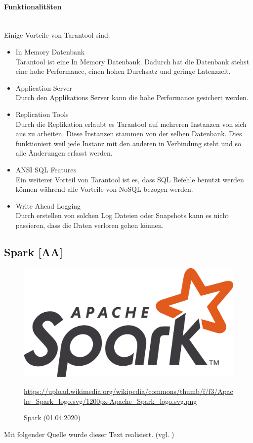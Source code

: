 \paragraph{Funktionalitäten}\mbox{} \\
Einige Vorteile von Tarantool sind:
\begin{itemize}
\item{In Memory Datenbank} \mbox{} \\
Tarantool ist eine In Memory Datenbank. Dadurch hat die Datenbank stehst eine hohe Performance, einen hohen Durchsatz und geringe Latenzzeit. 
\item{Application Server} \mbox{} \\
Durch den Applikations Server kann die hohe Performance gesichert werden. 
\item{Replication Tools} \mbox{} \\
Durch die Replikation erlaubt es Tarantool auf mehreren Instanzen von sich aus zu arbeiten. Diese Instanzen stammen von der selben Datenbank. Dies funktioniert weil jede Instanz mit den anderen in Verbindung steht und so alle Änderungen erfasst werden. 
\item{ANSI SQL Features} \mbox{} \\
Ein weiterer Vorteil von Tarantool ist es, dass SQL Befehle benutzt werden können während alle Vorteile von NoSQL bezogen werden.
\item{Write Ahead Logging} \mbox{} \\
Durch erstellen von solchen Log Dateien oder Snapshots kann es nicht passieren, dass die Daten verloren gehen können.
\end{itemize}
\newpage
\subsection{Spark [AA]}\label{ssec:Spark}
\begin{figure}[H]
\centering
  \includegraphics[scale=0.3]{images/Apache_Spark.png}
  \caption[Spark (01.04.2020)]{Spark (01.04.2020)}
  \url{https://upload.wikimedia.org/wikipedia/commons/thumb/f/f3/Apache_Spark_logo.svg/1200px-Apache_Spark_logo.svg.png}
  \label{fig:Spark}
\end{figure}
Mit folgender Quelle wurde dieser Text realisiert. (vgl. \cite{data_spark_2020})
